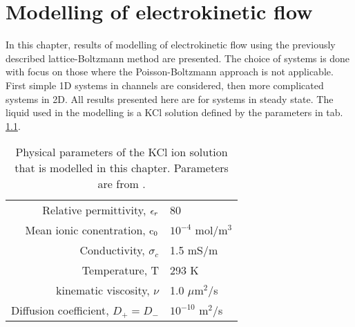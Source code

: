 \chapter{Modelling of electrokinetic flow}\label{sec:res}
In this chapter, results of modelling of electrokinetic flow using the
previously described lattice-Boltzmann method are presented. The
choice of systems is done with focus on those where the
Poisson-Boltzmann approach is not applicable. First simple 1D systems
in channels are considered, then more complicated systems in 2D. All
results presented here are for systems in steady state. The liquid
used in the modelling is a KCl solution defined by the parameters in
tab. \ref{tab:res:param}.

\begin{table}
  \caption{Physical parameters of the KCl ion solution that is modelled
    in this chapter. Parameters are from \cite{dongquing-ren-book}. }
\begin{center}
    \begin{tabular}{ | r | l |}
    \hline
    Relative permittivity, $\epsilon_r$ & 80\\
    Mean ionic conentration, $\mathrm{c_0}$ & $10^{-4}$ mol/m$^3$\\
    Conductivity, $\sigma_c$ & 1.5 mS/m\\
    Temperature, T & 293 K\\
    kinematic viscosity, $\nu$ & 1.0 $\mu$m$^2$/s\\
    Diffusion coefficient, $D_+ = D_{-}$ & $ 10^{-10}$ m$^2$/s\\
    \hline
    \end{tabular}
\end{center}    
\label{tab:res:param}
\end{table}










